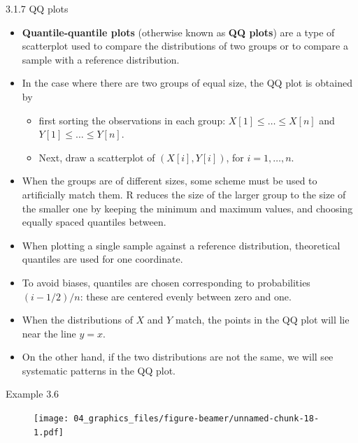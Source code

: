 \documentclass[
  9pt,
  a4paper,
  ignorenonframetext,
  notheorems]{beamer}
\providecommand{\tightlist}{%
  \setlength{\itemsep}{0pt}\setlength{\parskip}{0pt}}\usepackage{longtable,booktabs,array}
\begin{document}
\begin{frame}{3.1.7 QQ plots}
\protect\hypertarget{qq-plots}{}
\begin{itemize}
\item
  \textbf{Quantile-quantile plots} (otherwise known as \textbf{QQ
  plots}) are a type of scatterplot used to compare the distributions of
  two groups or to compare a sample with a reference distribution.
\item
  In the case where there are two groups of equal size, the QQ plot is
  obtained by

  \begin{itemize}
  \tightlist
  \item
    first sorting the observations in each group:
    \(X[1] \leq \ldots \leq X[n]\) and \(Y[1] \leq \ldots \leq Y[n]\).
  \item
    Next, draw a scatterplot of \((X[i],Y[i])\), for \(i = 1,\ldots,n\).
  \end{itemize}
\item
  When the groups are of different sizes, some scheme must be used to
  artificially match them. R reduces the size of the larger group to the
  size of the smaller one by keeping the minimum and maximum values, and
  choosing equally spaced quantiles between.
\end{itemize}

\begin{itemize}
\item
  When plotting a single sample against a reference distribution,
  theoretical quantiles are used for one coordinate.
\item
  To avoid biases, quantiles are chosen corresponding to probabilities
  \((i − 1/2)/n\): these are centered evenly between zero and one.
\end{itemize}

\begin{itemize}
\tightlist
\item
  When the distributions of \(X\) and \(Y\) match, the points in the QQ
  plot will lie near the line \(y = x\).
\end{itemize}

\begin{itemize}
\tightlist
\item
  On the other hand, if the two distributions are not the same, we will
  see systematic patterns in the QQ plot.
\end{itemize}
\end{frame}

\begin{frame}
\begin{block}{Example 3.6}
\protect\hypertarget{example-3.6}{}
\begin{figure}

{\centering \texttt{[image: 04\_graphics\_files/figure-beamer/unnamed-chunk-18-1.pdf]}

}

\end{figure}
\end{block}
\end{frame}
\end{document}
